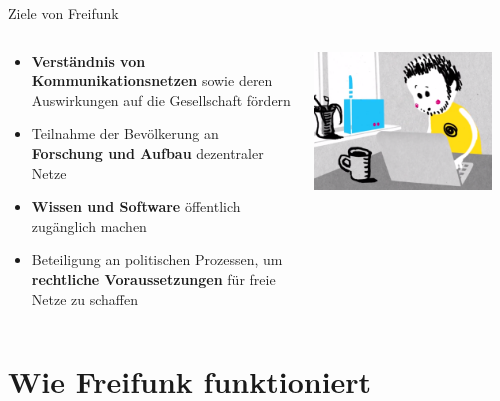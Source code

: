 \documentclass[10pt]{beamer}
\begin{document}
  \begin{frame}{Ziele von Freifunk}
    \begin{columns}[T]
     \begin{column}{5cm}
        \begin{itemize}
          \item \textbf{Verständnis von Kommunikationsnetzen} sowie deren Auswirkungen auf die Gesellschaft fördern
          \item Teilnahme der Bevölkerung an \textbf{Forschung und Aufbau} dezentraler Netze
          \item \textbf{Wissen und Software} öffentlich zugänglich machen
          \item Beteiligung an politischen Prozessen, um \textbf{rechtliche Voraussetzungen} für freie Netze zu schaffen
        \end{itemize}
      \end{column}
      \begin{column}{5cm}
        \includegraphics[width=0.9\textwidth]{images/install}
      \end{column}
    \end{columns}
  \end{frame}

  \section{Wie Freifunk funktioniert}
\end{document}
